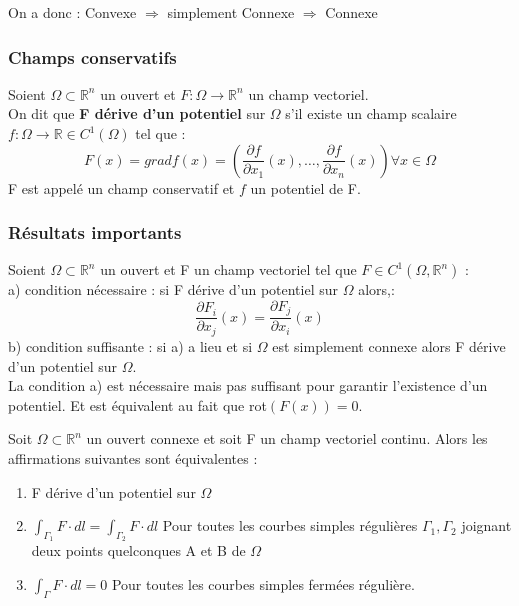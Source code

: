 \documentclass[../main.tex]{subfiles}
\begin{document}
On a donc : Convexe $\Rightarrow$ simplement Connexe $\Rightarrow$ Connexe\\

\subsubsection{Champs conservatifs}
Soient $\Omega \subset \mathbb{R}^n$ un ouvert et $F:\Omega \rightarrow \mathbb{R}^n$ un champ vectoriel.\\
On dit que \textbf{F dérive d'un potentiel} sur $\Omega$ s'il existe un champ scalaire $f:\Omega \rightarrow \mathbb{R} \in C^1(\Omega)$ tel que :\\
\begin{equation}
    F(x) = grad f(x) = (\frac{\partial f}{\partial x_1}(x), \dots, \frac{\partial f}{\partial x_n}(x)) \forall x\in \Omega
\end{equation}
F est appelé un champ conservatif et $f$ un potentiel de F.\\

\subsubsection{Résultats importants}
\begin{theorem}
Soient $\Omega \subset \mathbb{R}^n$ un ouvert et F un champ vectoriel tel que $F\in C^1(\Omega, \mathbb{R}^n)$ :\\
a) condition nécessaire : si F dérive d'un potentiel sur $\Omega$ alors,:\\
\begin{equation}
    \frac{\partial F_i}{\partial x_j}(x) = \frac{\partial F_j}{\partial x_i}(x)
\end{equation}
b) condition suffisante : si a) a lieu et si $\Omega$ est simplement connexe alors F dérive d'un potentiel sur $\Omega$.\\
\warning La condition a) est nécessaire mais pas suffisant pour garantir l'existence d'un potentiel. Et est équivalent au fait que rot$(F(x)) = 0$.
\end{theorem}

\begin{theorem}
    Soit $\Omega \subset \mathbb{R}^n$ un ouvert connexe et soit F un champ vectoriel continu. Alors les affirmations suivantes sont équivalentes :\\
\begin{enumerate}
    \item F dérive d'un potentiel sur $\Omega$\\
    \item $\int_{\Gamma_1} F\cdot dl = \int_{\Gamma_2} F\cdot dl$ Pour toutes les courbes simples régulières $\Gamma_1, \Gamma_2$ joignant deux points quelconques A et B de $\Omega$\\
    \item $\int_{\Gamma} F\cdot dl =0$ Pour toutes les courbes simples fermées régulière.\\
\end{enumerate}
\end{theorem} 
\end{document}
